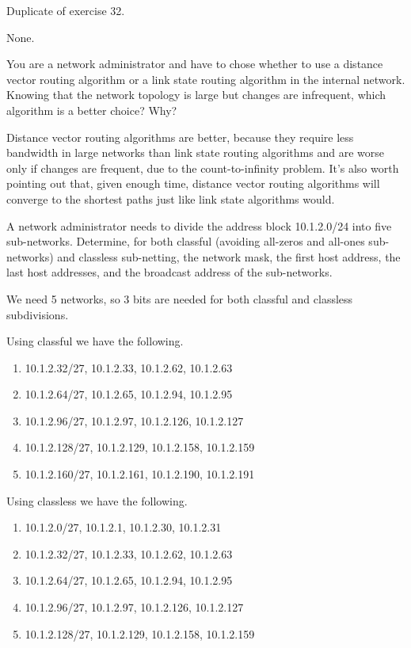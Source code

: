 \begin{Exercise}
Duplicate of exercise 32.
\end{Exercise}
\begin{Answer}
None.
\end{Answer}

\begin{Exercise}
You are a network administrator and have to chose whether to use a distance vector routing algorithm or a link state routing algorithm in the internal network.
Knowing that the network topology is large but changes are infrequent, which algorithm is a better choice? Why?
\end{Exercise}
\begin{Answer}
Distance vector routing algorithms are better, because they require less bandwidth in large networks than link state routing algorithms and are worse only if changes are frequent, due to the count-to-infinity problem.
It's also worth pointing out that, given enough time, distance vector routing algorithms will converge to the shortest paths just like link state algorithms would.
\end{Answer}

\begin{Exercise}
A network administrator needs to divide the address block 10.1.2.0/24 into five sub-networks.
Determine, for both classful (avoiding all-zeros and all-ones sub-networks) and classless sub-netting, the network mask, the first host address, the last host addresses, and the broadcast address of the sub-networks.
\end{Exercise}
\begin{Answer}
We need 5 networks, so 3 bits are needed for both classful and classless subdivisions.

Using classful we have the following.
\begin{enumerate}
\item 10.1.2.32/27, 10.1.2.33, 10.1.2.62, 10.1.2.63
\item 10.1.2.64/27, 10.1.2.65, 10.1.2.94, 10.1.2.95
\item 10.1.2.96/27, 10.1.2.97, 10.1.2.126, 10.1.2.127
\item 10.1.2.128/27, 10.1.2.129, 10.1.2.158, 10.1.2.159
\item 10.1.2.160/27, 10.1.2.161, 10.1.2.190, 10.1.2.191
\end{enumerate}

Using classless we have the following.
\begin{enumerate}
\item 10.1.2.0/27, 10.1.2.1, 10.1.2.30, 10.1.2.31
\item 10.1.2.32/27, 10.1.2.33, 10.1.2.62, 10.1.2.63
\item 10.1.2.64/27, 10.1.2.65, 10.1.2.94, 10.1.2.95
\item 10.1.2.96/27, 10.1.2.97, 10.1.2.126, 10.1.2.127
\item 10.1.2.128/27, 10.1.2.129, 10.1.2.158, 10.1.2.159
\end{enumerate}
\end{Answer}

